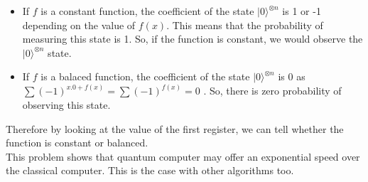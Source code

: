 \begin{enumerate}
\begin{itemize}
\item If $f$ is a constant function, the coefficient of the state $|0\rangle^{\otimes n}$ is 1 or -1 depending on the value of $f(x)$. This means that the probability of measuring this state is 1. So, if the function is constant, we would observe the $|0\rangle^{\otimes n}$ state.
\item If $f$ is a balaced function, the coefficient of  the state $|0\rangle^{\otimes n}$ is 0 as $\sum(-1)^{x.0 + f(x)} = \sum(-1)^{f(x)} = 0 $ . So, there is zero probability of observing this state.
\end{itemize}
\end{enumerate}

Therefore by looking at the value of the first register, we can tell whether the function is constant or balanced.\\
This problem shows that quantum computer may offer an exponential speed over the classical computer. This is the case with other algorithms too.

